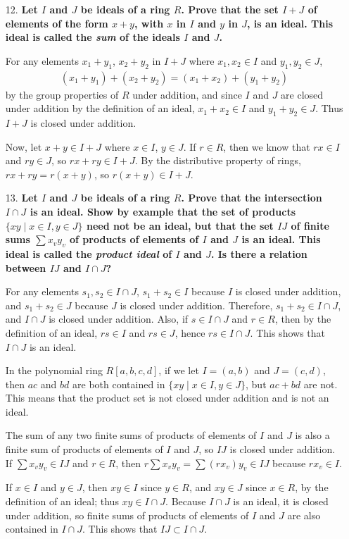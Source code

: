 \documentclass[a4paper,12pt]{article}
\begin{document}
\begin{enumerate}
    \item[12.]
        \boldmath
        \textbf{Let $I$ and $J$ be ideals of a ring $R$. Prove that the set $I + J$ of elements of the form $x + y$, with $x$ in $I$ and $y$ in $J$, is an ideal. This ideal is called the \textit{sum} of the ideals $I$ and $J$.} \par
        \unboldmath
        For any elements $x_1 + y_1$, $x_2 + y_2$ in $I + J$ where $x_1, x_2 \in I$ and $y_1, y_2 \in J$,
        \begin{align*}
            (x_1 + y_1) + (x_2 + y_2) = (x_1 + x_2) + (y_1 + y_2)
        \end{align*}
        by the group properties of $R$ under addition, and since $I$ and $J$ are closed under addition by the definition of an ideal, $x_1 + x_2 \in I$ and $y_1 + y_2 \in J$. Thus $I + J$ is closed under addition. \par
        Now, let $x + y \in I + J$ where $x \in I$, $y \in J$. If $r \in R$, then we know that $rx \in I$ and $ry \in J$, so $rx + ry \in I + J$. By the distributive property of rings, $rx + ry = r(x + y)$, so $r(x + y) \in I + J$.

    \item[13.]
        \boldmath
        \textbf{Let $I$ and $J$ be ideals of a ring $R$. Prove that the intersection $I \cap J$ is an ideal. Show by example that the set of products $\{ xy \mid x \in I, y \in J \}$ need not be an ideal, but that the set $IJ$ of finite sums $\sum x_v y_v$ of products of elements of $I$ and $J$ is an ideal. This ideal is called the \textit{product ideal} of $I$ and $J$. Is there a relation between $IJ$ and $I \cap J$?} \par
        \unboldmath
        For any elements $s_1, s_2 \in I \cap J$, $s_1 + s_2 \in I$ because $I$ is closed under addition, and $s_1 + s_2 \in J$ because $J$ is closed under addition. Therefore, $s_1 + s_2 \in I \cap J$, and $I \cap J$ is closed under addition. Also, if $s \in I \cap J$ and $r \in R$, then by the definition of an ideal, $rs \in I$ and $rs \in J$, hence $rs \in I \cap J$. This shows that $I \cap J$ is an ideal. \par
        In the polynomial ring $R[a, b, c, d]$, if we let $I = (a, b)$ and $J = (c, d)$, then $ac$ and $bd$ are both contained in $\{ xy \mid x \in I, y \in J \}$, but $ac + bd$ are not. This means that the product set is not closed under addition and is not an ideal. \par
        The sum of any two finite sums of products of elements of $I$ and $J$ is also a finite sum of products of elements of $I$ and $J$, so $IJ$ is closed under addition. If $\sum x_v y_v \in IJ$ and $r \in R$, then $r \sum x_v y_v = \sum (rx_v) y_v \in IJ$ because $rx_v \in I$. \par
        If $x \in I$ and $y \in J$, then $xy \in I$ since $y \in R$, and $xy \in J$ since $x \in R$, by the definition of an ideal; thus $xy \in I \cap J$. Because $I \cap J$ is an ideal, it is closed under addition, so finite sums of products of elements of $I$ and $J$ are also contained in $I \cap J$. This shows that $IJ \subset I \cap J$.
\end{enumerate}
\end{document}
